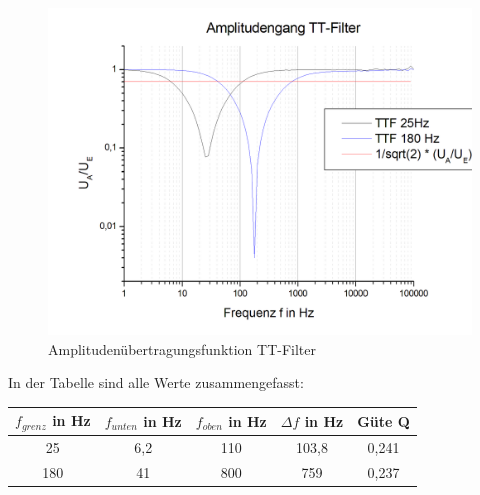\documentclass{scrartcl}						%
\begin{document}
			\clearpage
			\begin{figure}[h!]
					\centering
					\includegraphics[scale=0.4]{A1b}
					\caption{Amplitudenübertragungsfunktion TT-Filter}
			\end{figure}
			
			In der Tabelle sind alle Werte zusammengefasst:
			\center
			\begin{tabular}{|c|c|c|c|c|}
			\hline $f_{grenz} $ in Hz & $f_{unten}$ in Hz & $f_{oben}$ in Hz & $\Delta f$ in Hz & Güte Q \\ 
			\hline 25 & 6,2 & 110 & 103,8 & 0,241 \\ 
			\hline 180 & 41 & 800 & 759 & 0,237 \\ 
			\hline 
			\end{tabular} 
			\flushleft
			
\end{document}
